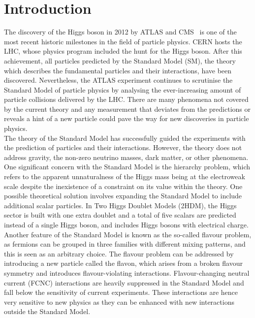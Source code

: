 \setchapterpreamble[u]{\margintoc}
\chapter*{Introduction}
The discovery of the Higgs boson in 2012 by ATLAS and CMS~\cite{ATLASHiggs2012,CMShiggs2012} is one of the most recent historic milestones in the field of particle physics. CERN hosts the LHC, whose physics program included the hunt for the Higgs boson. After this achievement, all particles predicted by the Standard Model (SM), the theory which describes the fundamental particles and their interactions, have been discovered. Nevertheless, the ATLAS experiment continues to scrutinise the Standard Model of particle physics by analysing the ever-increasing amount of particle collisions delivered by the LHC. There are many phenomena not covered by the current theory and any measurement that deviates from the predictions or reveals a hint of a new particle could pave the way for new discoveries in particle physics.\\

The theory of the Standard Model has successfully guided the experiments with the prediction of particles and their interactions. However, the theory does not address gravity, the non-zero neutrino masses, dark matter, or other phenomena. One significant concern with the Standard Model is the hierarchy problem, which refers to the apparent unnaturalness of the Higgs mass being at the electroweak scale despite the inexistence of a constraint on its value within the theory. One possible theoretical solution involves expanding the Standard Model to include additional scalar particles. In Two Higgs Doublet Models (2HDM), the Higgs sector is built with one extra doublet and a total of five scalars are predicted instead of a single Higgs boson, and includes Higgs bosons with electrical charge.
Another feature of the Standard Model is known as the so-called flavour problem, as fermions can be grouped in three families with different mixing patterns, and this is seen as an arbitrary choice. The flavour problem can be addressed by introducing a new particle called the flavon, which arises from a broken flavour symmetry and introduces flavour-violating interactions. Flavour-changing neutral current (FCNC) interactions are heavily suppressed in the Standard Model and fall below the sensitivity of current experiments. These interactions are hence very sensitive to new physics as they can be enhanced with new interactions outside the Standard Model.\\

